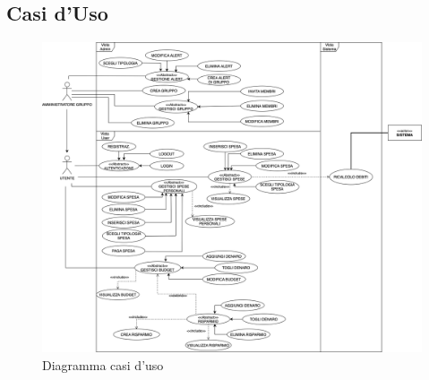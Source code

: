 \subsection{Casi d'Uso}

    \begin{figure}[h]
        \centering
        \includegraphics[width=1\textwidth, trim=3cm 0cm 1cm 0cm]{images/DiagrammaCasiDusoV2.4.png}
        \caption{Diagramma casi d'uso }
    \end{figure}
